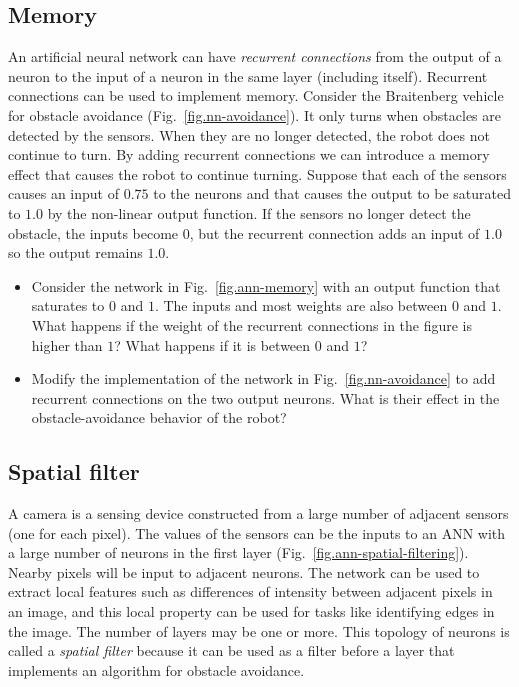 \subsection{Memory}\label{s.ann-memory}

An artificial neural network can have \emph{recurrent connections} from the output of a neuron to the input of a neuron in the same layer (including itself). Recurrent connections can be used to implement memory. Consider the Braitenberg vehicle for obstacle avoidance (Fig.~\ref{fig.nn-avoidance}). It only turns when obstacles are detected by the sensors. When they are no longer detected, the robot does not continue to turn. By adding recurrent connections we can introduce a memory effect that causes the robot to continue turning. Suppose that each of the sensors causes an input of $0.75$ to the neurons and that causes the output to be saturated to $1.0$ by the non-linear output function. If the sensors no longer detect the obstacle, the inputs become $0$, but the recurrent connection adds an input of $1.0$ so the output remains $1.0$.

\begin{framed}
\begin{itemize}
\item Consider the network in Fig.~\ref{fig.ann-memory} with an output function that saturates to $0$ and $1$. The inputs and most weights are also between $0$ and $1$. What happens if the weight of the recurrent connections in the figure is higher than $1$? What happens if it is between $0$ and $1$?
\item Modify the implementation of the network in Fig.~\ref{fig.nn-avoidance} to add recurrent connections on the two output neurons. What is their effect in the obstacle-avoidance behavior of the robot?
\end{itemize}
\end{framed}

\subsection{Spatial filter}

A camera is a sensing device constructed from a large number of adjacent sensors (one for each pixel). The values of the sensors can be the inputs to an ANN with a large number of neurons in the first layer (Fig.~\ref{fig.ann-spatial-filtering}). Nearby pixels will be input to adjacent neurons. The network can be used to extract local features such as differences of intensity between adjacent pixels in an image, and this local property can be used for tasks like identifying edges in the image. The number of layers may be one or more. This topology of neurons is called a \emph{spatial filter} because it can be used as a filter before a layer that implements an algorithm for obstacle avoidance.

